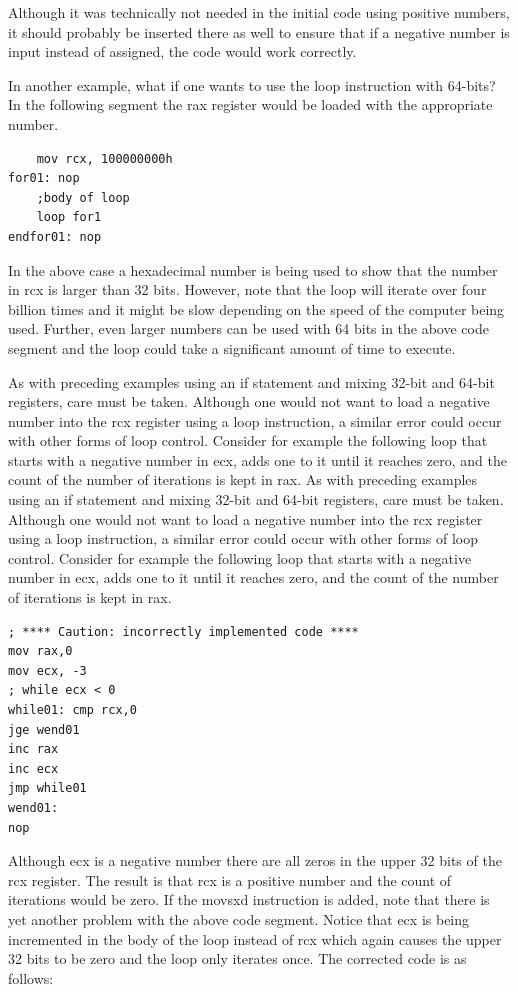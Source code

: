 \documentclass[10pt]{book}
\begin{document}
Although it was technically not needed in the initial code using positive numbers, it should probably be inserted there as well to ensure that if a negative number is input instead of assigned, the code would work correctly.

In another example, what if one wants to use the loop instruction with 64-bits? In the following segment the rax register would be loaded with the appropriate number.

\begin{verbatim}
    mov rcx, 100000000h
for01: nop
    ;body of loop
    loop for1
endfor01: nop
\end{verbatim}

In the above case a hexadecimal number is being used to show that the number in rcx is larger than 32 bits. However, note that the loop will iterate over four billion times and it might be slow depending on the speed of the computer being used. Further, even larger numbers can be used with 64 bits in the above code segment and the loop could take a significant amount of time to execute.

As with preceding examples using an if statement and mixing 32-bit and 64-bit registers, care must be taken. Although one would not want to load a negative number into the rcx register using a loop instruction, a similar error could occur with other forms of loop control. Consider for example the following loop that starts with a negative number in ecx, adds one to it until it reaches zero, and the count of the number of iterations is kept in rax.
As with preceding examples using an if statement and mixing 32-bit and 64-bit registers, care must be taken. Although one would not want to load a negative number into the rcx register using a loop instruction, a similar error could occur with other forms of loop control. Consider for example the following loop that starts with a negative number in ecx, adds one to it until it reaches zero, and the count of the number of iterations is kept in rax.

\begin{verbatim}
; **** Caution: incorrectly implemented code ****
mov rax,0
mov ecx, -3
; while ecx < 0
while01: cmp rcx,0
jge wend01
inc rax
inc ecx
jmp while01
wend01:
nop
\end{verbatim}

Although ecx is a negative number there are all zeros in the upper 32 bits of the rcx register. The result is that rcx is a positive number and the count of iterations would be zero. If the movsxd instruction is added, note that there is yet another problem with the above code segment. Notice that ecx is being incremented in the body of the loop instead of rcx which again causes the upper 32 bits to be zero and the loop only iterates once. The corrected code is as follows:
\end{document}
